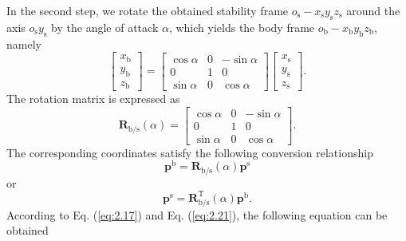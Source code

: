 In the second step, we rotate the obtained stability frame ${{o}_{\text{s}}}-{{x}_{\text{s}}}{{y}_{\text{s}}}{{z}_{\text{s}}}$
around the axis ${{o}_{\text{s}}}{{y}_{\text{s}}}$ by the angle of
attack $\alpha$, which yields the body frame ${{o}_{\text{b}}}-{{x}_{\text{b}}}{{y}_{\text{b}}}{{z}_{\text{b}}}$,
namely 
\begin{equation}
\left[\begin{array}{l}
{x_{\text{b}}}\\
{y_{\text{b}}}\\
{z_{\text{b}}}
\end{array}\right]=\left[{\begin{array}{ccc}
	{\cos\alpha} & 0 & {-\sin\alpha}\\
	0 & 1 & 0\\
	{\sin\alpha} & 0 & {\cos\alpha}
	\end{array}}\right]\left[\begin{array}{l}
{x_{\text{s}}}\\
{y_{\text{s}}}\\
{z_{\text{s}}}
\end{array}\right].\label{eq:2.21}
\end{equation}
The rotation matrix is expressed as
\begin{equation}
{{\mathbf{R}}_{\text{{b}/{s}}}}\left(\alpha\right)=\left[\begin{array}{ccc}
{\cos\alpha} & 0 & {-\sin\alpha}\\
0 & 1 & 0\\
{\sin\alpha} & 0 & {\cos\alpha}
\end{array}\right].\label{eq:2.22}
\end{equation}
The corresponding coordinates satisfy the following conversion relationship
\begin{equation}
{{\mathbf{p}}^{\text{b}}}={{\mathbf{R}}_{\text{b/s}}}\left(\alpha\right){{\mathbf{p}}^{\text{s}}}\label{eq:2.23}
\end{equation}
or
\begin{equation}
{{\mathbf{p}}^{\text{s}}}=\mathbf{R}_{\text{b/s}}^{\text{T}}\left(\alpha\right){{\mathbf{p}}^{\text{b}}}.\label{eq:2.24}
\end{equation}
According to Eq. (\ref{eq:2.17}) and Eq. (\ref{eq:2.21}), the following
equation can be obtained
